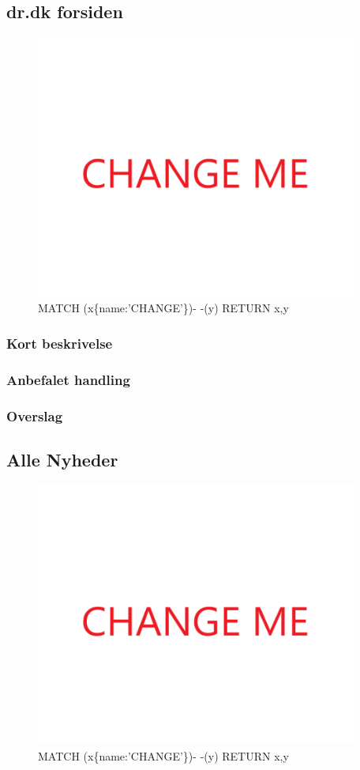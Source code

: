 \documentclass{article}
\begin{document}
\subsection{dr.dk forsiden}
\begin{figure}[h]
\includegraphics[width=300pt]{CHANGE.PNG}
\caption{MATCH (x\{name:'CHANGE'\})- -(y) RETURN x,y}
\end{figure}
\subsubsection{Kort beskrivelse}
\subsubsection{Anbefalet handling}
\subsubsection{Overslag}
\subsection{Alle Nyheder}
\begin{figure}[h]
\includegraphics[width=300pt]{CHANGE.PNG}
\caption{MATCH (x\{name:'CHANGE'\})- -(y) RETURN x,y}
\end{figure}
\end{document}

